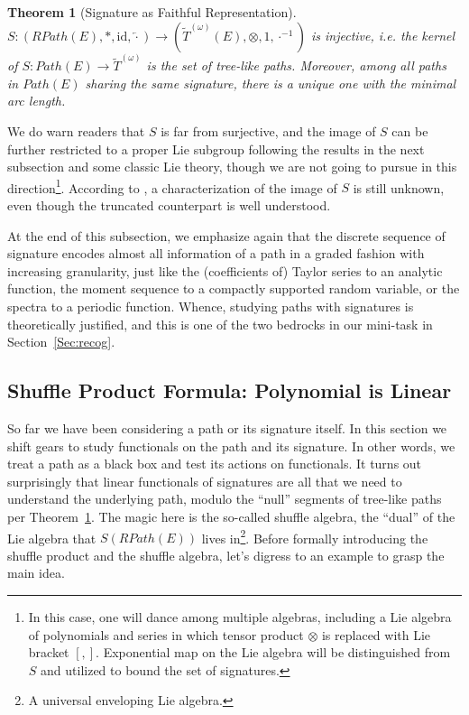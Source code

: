 \documentclass[fleqn]{article}
\newtheorem{thm}{Theorem}[section]
\theoremstyle{definition}
\theoremstyle{remark}
\newcommand{\id}{\mathrm{id}} %
\begin{document}
\begin{thm}[Signature as Faithful Representation] \label{thm:faithful}
$S:\left(RPath(E),*,\id,\overleftarrow{\cdot}\right) \to \left(\tilde{T}^{(\omega)}(E),\otimes,1,\cdot^{-1}\right)$ is injective, i.e. the kernel of $S:Path(E)\to \tilde{T}^{(\omega)}$ is the set of tree-like paths. Moreover, among all paths in $Path(E)$ sharing the same signature, there is a unique one with the minimal arc length.
\end{thm}
We do warn readers that $S$ is far from surjective, and the image of $S$ can be further restricted to a proper Lie subgroup following the results in the next subsection and some classic Lie theory, though we are not going to pursue in this direction\footnote{In this case, one will dance among multiple algebras, including a Lie algebra of polynomials and series in which tensor product $\otimes$ is replaced with Lie bracket $[,]$. Exponential map on the Lie algebra will be distinguished from $S$ and utilized to bound the set of signatures.}. According to \citet{Geng2016CCF}, a characterization of the image of $S$ is still unknown, even though the truncated counterpart is well understood.

\par
At the end of this subsection, we emphasize again that the discrete sequence of signature encodes almost all information of a path in a graded fashion with increasing granularity, just like the (coefficients of) Taylor series to an analytic function, the moment sequence to a compactly supported random variable, or the spectra to a periodic function. Whence, studying paths with signatures is theoretically justified, and this is one of the two bedrocks in our mini-task in Section~\ref{Sec:recog}.

\subsection{Shuffle Product Formula: Polynomial is Linear}
So far we have been considering a path or its signature itself. In this section we shift gears to study functionals on the path and its signature. In other words, we treat a path as a black box and test its actions on functionals. It turns out surprisingly that linear functionals of signatures are all that we need to understand the underlying path, modulo the ``null'' segments of tree-like paths per Theorem~\ref{thm:faithful}. The magic here is the so-called shuffle algebra, the ``dual'' of the Lie algebra that $S(RPath(E))$ lives in\footnote{A universal enveloping Lie algebra.}. Before formally introducing the shuffle product and the shuffle algebra, let's digress to an example to grasp the main idea.
\end{document}
